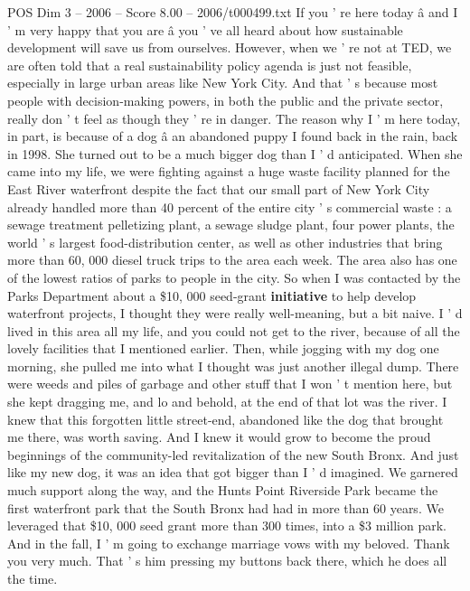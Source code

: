\begin{textsample}{POS Dim 3 – 2006 – Score 8.00 – 2006/t000499.txt}  \label{ex:f3_pos_066}
If you ' re here today â and I ' m very happy that you are â you ' ve all heard about how sustainable development will save us from ourselves.
However, when we ' re not at TED, we are often told that a real sustainability policy agenda is just not feasible, especially in large urban areas like New York City.
And that ' s because most people with decision-making powers, in both the public and the private sector, really don ' t feel as though they ' re in danger.
The reason why I ' m here today, in part, is because of a dog â an abandoned puppy I found back in the rain, back in 1998.
She turned out to be a much bigger dog than I ' d anticipated.
When she came into my life, we were fighting against a huge waste facility planned for the East River waterfront despite the fact that our small part of New York City already handled more than 40 percent of the entire city ' s commercial waste : a sewage treatment pelletizing plant, a sewage sludge plant, four power plants, the world ' s largest food-distribution center, as well as other industries that bring more than 60, 000 diesel truck trips to the area each week.
The area also has one of the lowest ratios of parks to people in the city.
So when I was contacted by the Parks Department about a \$10, 000 seed-grant \textbf{initiative} to help develop waterfront projects, I thought they were really well-meaning, but a bit naive.
I ' d lived in this area all my life, and you could not get to the river, because of all the lovely facilities that I mentioned earlier.
Then, while jogging with my dog one morning, she pulled me into what I thought was just another illegal dump.
There were weeds and piles of garbage and other stuff that I won ' t mention here, but she kept dragging me, and lo and behold, at the end of that lot was the river.
I knew that this forgotten little street-end, abandoned like the dog that brought me there, was worth saving.
And I knew it would grow to become the proud beginnings of the community-led revitalization of the new South Bronx.
And just like my new dog, it was an idea that got bigger than I ' d imagined.
We garnered much support along the way, and the Hunts Point Riverside Park became the first waterfront park that the South Bronx had had in more than 60 years.
We leveraged that \$10, 000 seed grant more than 300 times, into a \$3 million park.
And in the fall, I ' m going to exchange marriage vows with my beloved.
Thank you very much.
That ' s him pressing my buttons back there, which he does all the time.

\end{textsample}

